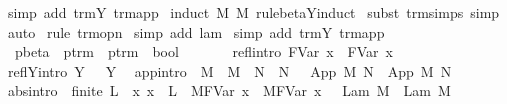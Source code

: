 \begin{isabellebody}
\isamarkupfalse%
\ {\isacharparenleft}simp\ add{\isacharcolon}\ trm{\isachardot}Y\ trm{\isachardot}app{\isacharparenright}\isanewline
{}\isamarkupfalse%
\ {\isacharparenleft}induct\ M\ M{\isacharprime}\ rule{\isacharcolon}beta{\isacharunderscore}Y{\isachardot}induct{\isacharparenright}\isanewline
{}\isamarkupfalse%
\ {\isacharparenleft}subst\ trm{\isachardot}simps{\isacharcomma}\ simp{\isacharparenright}{\isacharplus}\isanewline
{}\isamarkupfalse%
\ auto{\isacharbrackleft}{}{\isacharbrackright}\isanewline
{}\isamarkupfalse%
\ {\isacharparenleft}rule\ trm{\isacharunderscore}opn{\isacharparenright}\isanewline
{}\isamarkupfalse%
\ {\isacharparenleft}simp\ add{\isacharcolon}\ lam{\isacharparenright}\isanewline
{}\isamarkupfalse%
\ {\isacharparenleft}simp\ add{\isacharcolon}\ trm{\isachardot}Y\ trm{\isachardot}app{\isacharparenright}\isanewline
{}\isamarkupfalse%
%
\endisatagproof
{\isafoldproof}%
%
\isadelimproof
%
\endisadelimproof
%
\isamarkuptrue%
\isamarkupfalse%
\ \isanewline
\ \ pbeta\ {\isacharcolon}{\isacharcolon}\ {\isachardoublequoteopen}ptrm\ {\isasymRightarrow}\ ptrm\ {\isasymRightarrow}\ bool{\isachardoublequoteclose}\ {\isacharparenleft}{\isachardoublequoteopen}{\isacharunderscore}\ {\isasymggreater}\ {\isacharunderscore}{\isachardoublequoteclose}\ {\isacharbrackleft}{}{}{\isacharcomma}{}{}{\isacharbrackright}\ {}{}{\isacharparenright}\isanewline
{}\isanewline
\ \ refl{\isacharbrackleft}intro{\isacharbrackright}{\isacharcolon}\ {\isachardoublequoteopen}{\isacharparenleft}FVar\ x{\isacharparenright}\ {\isasymggreater}\ {\isacharparenleft}FVar\ x{\isacharparenright}{\isachardoublequoteclose}\isanewline
{\isacharbar}\ reflY{\isacharbrackleft}intro{\isacharbrackright}{\isacharcolon}\ {\isachardoublequoteopen}Y\ {\isasymsigma}\ {\isasymggreater}\ Y\ {\isasymsigma}{\isachardoublequoteclose}\isanewline
{\isacharbar}\ app{\isacharbrackleft}intro{\isacharbrackright}{\isacharcolon}\ {\isachardoublequoteopen}{\isasymlbrakk}\ M\ {\isasymggreater}\ M{\isacharprime}\ {\isacharsemicolon}\ N\ {\isasymggreater}\ N{\isacharprime}\ {\isasymrbrakk}\ {\isasymLongrightarrow}\ App\ M\ N\ {\isasymggreater}\ App\ M{\isacharprime}\ N{\isacharprime}{\isachardoublequoteclose}\isanewline
{\isacharbar}\ abs{\isacharbrackleft}intro{\isacharbrackright}{\isacharcolon}\ {\isachardoublequoteopen}{\isasymlbrakk}\ finite\ L\ {\isacharsemicolon}\ {\isacharparenleft}{\isasymAnd}x{\isachardot}\ x\ {\isasymnotin}\ L\ {\isasymLongrightarrow}\ M{\isacharcircum}{\isacharparenleft}FVar\ x{\isacharparenright}\ {\isasymggreater}\ M{\isacharprime}{\isacharcircum}{\isacharparenleft}FVar\ x{\isacharparenright}{\isacharparenright}\ {\isasymrbrakk}\ {\isasymLongrightarrow}\ Lam\ M\ {\isasymggreater}\ Lam\ M{\isacharprime}{\isachardoublequoteclose}\isanewline

\end{isabellebody}
